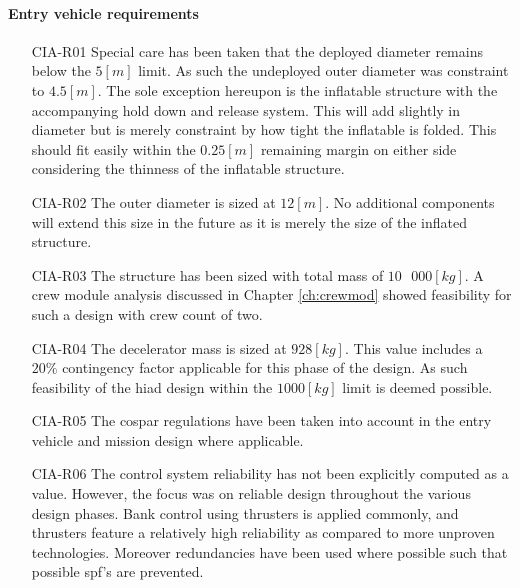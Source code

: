 \paragraph{Entry vehicle requirements}
\begin{itemize}[leftmargin=+20mm]
\item[CIA-R01] Special care has been taken that the deployed diameter remains below the $5 \left[m\right]$ limit. As such the undeployed outer diameter was constraint to $4.5 \left[m\right]$. The sole exception hereupon is the inflatable structure with the accompanying hold down and release system. This will add slightly in diameter but is merely constraint by how tight the inflatable is folded. This should fit easily within the $0.25 \left[m\right]$ remaining margin on either side considering the thinness of the inflatable structure. 
\item[CIA-R02] The outer diameter is sized at $12 \left[m\right]$. No additional components will extend this size in the future as it is merely the size of the inflated structure.
\item[CIA-R03] The structure has been sized with total mass of $10\mbox{ }000 \left[kg\right]$. A crew module analysis discussed in Chapter \ref{ch:crewmod} showed feasibility for such a design with crew count of two.
\item[CIA-R04] The decelerator mass is sized at $928 \left[kg\right]$. This value includes a $20\%$ contingency factor applicable for this phase of the design. As such feasibility of the \gls{hiad} design within the $1000 \left[kg\right]$ limit is deemed possible.
\item[CIA-R05] The \gls{cospar} regulations have been taken into account in the entry vehicle and mission design where applicable.
\item[CIA-R06] The control system reliability has not been explicitly computed as a value. However, the focus was on reliable design throughout the various design phases. Bank control using thrusters is applied commonly, and thrusters feature a relatively high reliability as compared to more unproven technologies. Moreover redundancies have been used where possible such that possible \gls{spf}'s are prevented. 
\end{itemize}


